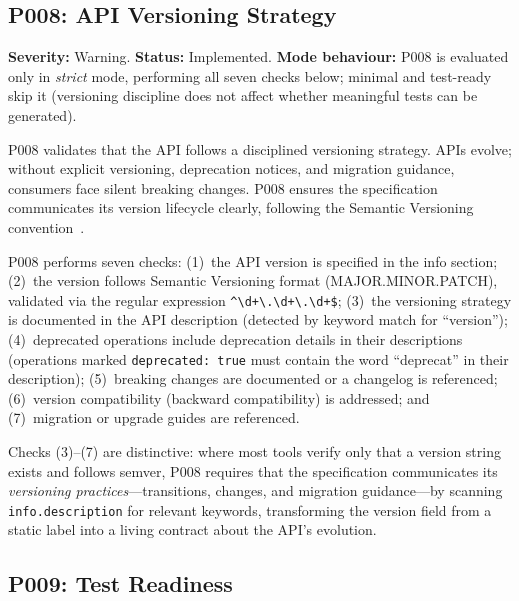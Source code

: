 \subsection{P008: API Versioning Strategy}
\label{subsec:p008}

\textbf{Severity:} Warning. \textbf{Status:} Implemented. \textbf{Mode behaviour:} P008 is evaluated only in \textit{strict} mode, performing all seven checks below; minimal and test-ready skip it (versioning discipline does not affect whether meaningful tests can be generated).

P008 validates that the API follows a disciplined versioning strategy. APIs evolve; without explicit versioning, deprecation notices, and migration guidance, consumers face silent breaking changes. P008 ensures the specification communicates its version lifecycle clearly, following the Semantic Versioning convention~\cite{semver}.

P008 performs seven checks: (1)~the API version is specified in the info section; (2)~the version follows Semantic Versioning format (MAJOR.MINOR.PATCH), validated via the regular expression \texttt{\textasciicircum\textbackslash d+\textbackslash.\textbackslash d+\textbackslash.\textbackslash d+\$}; (3)~the versioning strategy is documented in the API description (detected by keyword match for ``version''); (4)~deprecated operations include deprecation details in their descriptions (operations marked \texttt{deprecated: true} must contain the word ``deprecat'' in their description); (5)~breaking changes are documented or a changelog is referenced; (6)~version compatibility (backward compatibility) is addressed; and (7)~migration or upgrade guides are referenced.

Checks (3)--(7) are distinctive: where most tools verify only that a version string exists and follows semver, P008 requires that the specification communicates its \textit{versioning practices}---transitions, changes, and migration guidance---by scanning \texttt{info.description} for relevant keywords, transforming the version field from a static label into a living contract about the API's evolution.

\subsection{P009: Test Readiness}
\label{subsec:p009}

